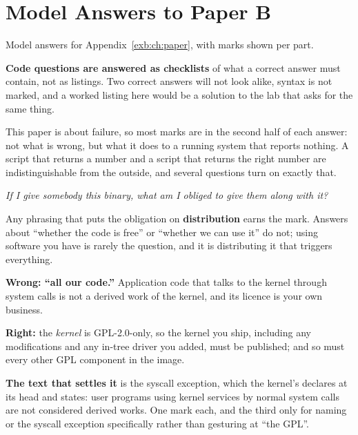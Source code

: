 
\renewcommand{\answerprefix}{ansb}

\chapter{Model Answers to Paper B}
\label{ansb:ch:answers}

Model answers for Appendix~\ref{exb:ch:paper}, with marks shown per part.

\textbf{Code questions are answered as checklists} of what a correct answer must contain, not as
listings. Two correct answers will not look alike, syntax is not marked, and a worked listing here
would be a solution to the lab that asks for the same thing.

This paper is about failure, so most marks are in the second half of each answer: not what is wrong,
but what it does to a running system that reports nothing. A script that returns a number and a
script that returns the right number are indistinguishable from the outside, and several questions
turn on exactly that.


\emph{If I give somebody this binary, what am I obliged to give them along with it?}

Any phrasing that puts the obligation on \textbf{distribution} earns the mark. Answers about
``whether the code is free'' or ``whether we can use it'' do not; using software you have is rarely
the question, and it is distributing it that triggers everything.

\textbf{Wrong: ``all our code.''} Application code that talks to the kernel through system calls is
not a derived work of the kernel, and its licence is your own business.

\textbf{Right:} the \emph{kernel} is GPL-2.0-only, so the kernel you ship, including any
modifications and any in-tree driver you added, must be published; and so must every other GPL
component in the image.

\textbf{The text that settles it} is the syscall exception, which the kernel's 
declares at its head and  states: user programs using
kernel services by normal system calls are not considered derived works. One mark each, and the
third only for naming  or the syscall exception specifically rather than gesturing at
``the GPL''.


